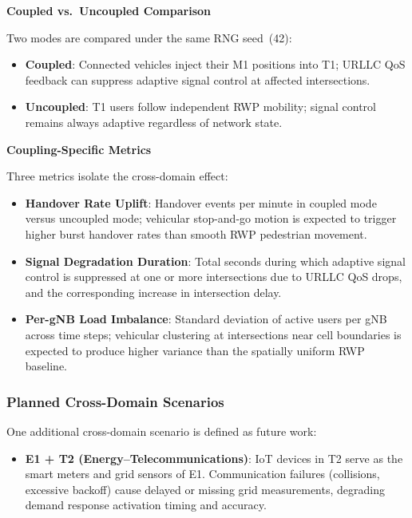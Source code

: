 \medskip\noindent\textbf{Coupled vs.\ Uncoupled Comparison}

Two modes are compared under the same RNG seed~(42):
\begin{itemize}
    \item \textbf{Coupled}: Connected vehicles inject their M1 positions into T1; URLLC QoS feedback can suppress adaptive signal control at affected intersections.
    \item \textbf{Uncoupled}: T1 users follow independent RWP mobility; signal control remains always adaptive regardless of network state.
\end{itemize}

\medskip\noindent\textbf{Coupling-Specific Metrics}

Three metrics isolate the cross-domain effect:
\begin{itemize}
    \item \textbf{Handover Rate Uplift}: Handover events per minute in coupled mode versus uncoupled mode; vehicular stop-and-go motion is expected to trigger higher burst handover rates than smooth RWP pedestrian movement.
    \item \textbf{Signal Degradation Duration}: Total seconds during which adaptive signal control is suppressed at one or more intersections due to URLLC QoS drops, and the corresponding increase in intersection delay.
    \item \textbf{Per-gNB Load Imbalance}: Standard deviation of active users per gNB across time steps; vehicular clustering at intersections near cell boundaries is expected to produce higher variance than the spatially uniform RWP baseline.
\end{itemize}


\subsubsection{Planned Cross-Domain Scenarios}

One additional cross-domain scenario is defined as future work:

\begin{itemize}
    \item \textbf{E1 + T2 (Energy--Telecommunications)}: IoT devices in T2 serve as the smart meters and grid sensors of E1. Communication failures (collisions, excessive backoff) cause delayed or missing grid measurements, degrading demand response activation timing and accuracy.
\end{itemize}


